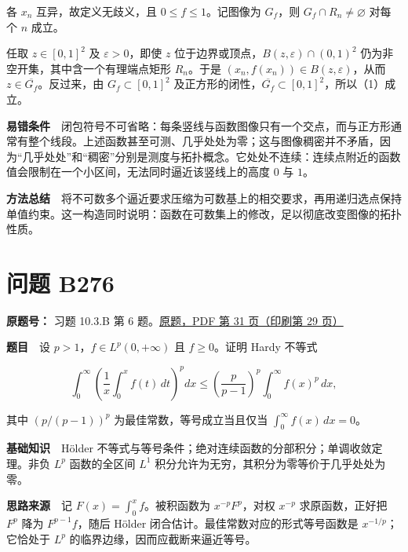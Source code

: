 \documentclass[11pt,a4paper]{article}
\begin{document}
各 \(x_n\) 互异，故定义无歧义，且 \(0\le f\le1\)。记图像为 \(G_f\)，则
\(G_f\cap R_n\ne\varnothing\) 对每个 \(n\) 成立。

任取 \(z\in[0,1]^2\) 及 \(\varepsilon>0\)，即使 \(z\)
位于边界或顶点，\(B(z,\varepsilon)\cap(0,1)^2\)
仍为非空开集，其中含一个有理端点矩形 \(R_n\)。于是
\((x_n,f(x_n))\in B(z,\varepsilon)\)，从而
\(z\in\overline{G_f}\)。反过来，由 \(G_f\subset[0,1]^2\)
及正方形的闭性，\(\overline{G_f}\subset[0,1]^2\)，所以（1）成立。

\textbf{易错条件}　闭包符号不可省略：每条竖线与函数图像只有一个交点，而与正方形通常有整个线段。上述函数甚至可测、几乎处处为零；这与图像稠密并不矛盾，因为``几乎处处''和``稠密''分别是测度与拓扑概念。它处处不连续：连续点附近的函数值会限制在一个小区间，无法同时逼近该竖线上的高度
\(0\) 与 \(1\)。

\textbf{方法总结}　将不可数多个逼近要求压缩为可数基上的相交要求，再用递归选点保持单值约束。这一构造同时说明：函数在可数集上的修改，足以彻底改变图像的拓扑性质。

\section{问题 B276}\label{ux95eeux9898-b276}

\textbf{原题号：} 习题 10.3.B 第 6
题。\href{https://zj139.github.io/math-notes/files/problems/楼分析习题-v2.pdf\#page=31}{原题，PDF
第 31 页（印刷第 29 页）}

\textbf{题目}　设 \(p>1\)，\(f\in L^p(0,+\infty)\) 且 \(f\ge0\)。证明
Hardy 不等式

\begin{equation}
\int_0^\infty\left(\frac1x\int_0^x f(t)\,dt\right)^pdx
\le\left(\frac p{p-1}\right)^p\int_0^\infty f(x)^p\,dx,
\tag{4}
\end{equation}

其中 \((p/(p-1))^p\) 为最佳常数，等号成立当且仅当
\(\int_0^\infty f(x)\,dx=0\)。

\textbf{基础知识}　Hölder
不等式与等号条件；绝对连续函数的分部积分；单调收敛定理。非负 \(L^p\)
函数的全区间 \(L^1\) 积分允许为无穷，其积分为零等价于几乎处处为零。

\textbf{思路来源}　记 \(F(x)=\int_0^x f\)。被积函数为
\(x^{-p}F^p\)，对权 \(x^{-p}\) 求原函数，正好把 \(F^p\) 降为
\(F^{p-1}f\)，随后 Hölder 闭合估计。最佳常数对应的形式等号函数是
\(x^{-1/p}\)；它恰处于 \(L^p\) 的临界边缘，因而应截断来逼近等号。
\end{document}
